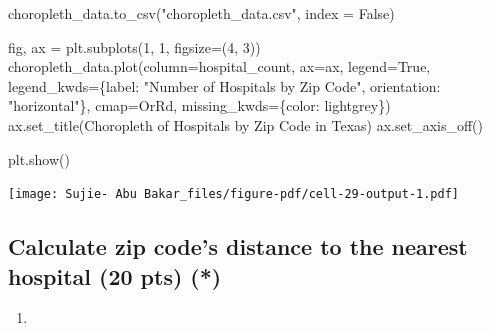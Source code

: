 \documentclass[
  letterpaper,
  DIV=11,
  numbers=noendperiod]{scrartcl}
\newenvironment{Shaded}{\begin{snugshade}}{\end{snugshade}}
\newcommand{\DecValTok}[1]{\textcolor[rgb]{0.68,0.00,0.00}{#1}}
\newcommand{\NormalTok}[1]{\textcolor[rgb]{0.00,0.23,0.31}{#1}}
\newcommand{\OperatorTok}[1]{\textcolor[rgb]{0.37,0.37,0.37}{#1}}
\newcommand{\StringTok}[1]{\textcolor[rgb]{0.13,0.47,0.30}{#1}}
\newcommand{\VariableTok}[1]{\textcolor[rgb]{0.07,0.07,0.07}{#1}}
\providecommand{\tightlist}{%
  \setlength{\itemsep}{0pt}\setlength{\parskip}{0pt}}\usepackage{longtable,booktabs,array}
\begin{document}
\begin{Shaded}
\begin{Highlighting}[]
\NormalTok{choropleth\_data.to\_csv(}\StringTok{"choropleth\_data.csv"}\NormalTok{, index }\OperatorTok{=} \VariableTok{False}\NormalTok{)}
\end{Highlighting}
\end{Shaded}

\begin{Shaded}
\begin{Highlighting}[]
\NormalTok{fig, ax }\OperatorTok{=}\NormalTok{ plt.subplots(}\DecValTok{1}\NormalTok{, }\DecValTok{1}\NormalTok{, figsize}\OperatorTok{=}\NormalTok{(}\DecValTok{4}\NormalTok{, }\DecValTok{3}\NormalTok{))}
\NormalTok{choropleth\_data.plot(column}\OperatorTok{=}\StringTok{\textquotesingle{}hospital\_count\textquotesingle{}}\NormalTok{, ax}\OperatorTok{=}\NormalTok{ax, legend}\OperatorTok{=}\VariableTok{True}\NormalTok{,}
\NormalTok{            legend\_kwds}\OperatorTok{=}\NormalTok{\{}\StringTok{\textquotesingle{}label\textquotesingle{}}\NormalTok{: }\StringTok{"Number of Hospitals by Zip Code"}\NormalTok{,}
                         \StringTok{\textquotesingle{}orientation\textquotesingle{}}\NormalTok{: }\StringTok{"horizontal"}\NormalTok{\},}
\NormalTok{            cmap}\OperatorTok{=}\StringTok{\textquotesingle{}OrRd\textquotesingle{}}\NormalTok{, missing\_kwds}\OperatorTok{=}\NormalTok{\{}\StringTok{\textquotesingle{}color\textquotesingle{}}\NormalTok{: }\StringTok{\textquotesingle{}lightgrey\textquotesingle{}}\NormalTok{\})}
\NormalTok{ax.set\_title(}\StringTok{\textquotesingle{}Choropleth of Hospitals by Zip Code in Texas\textquotesingle{}}\NormalTok{)}
\NormalTok{ax.set\_axis\_off()}

\NormalTok{plt.show()}
\end{Highlighting}
\end{Shaded}

\texttt{[image: Sujie- Abu Bakar\_files/figure-pdf/cell-29-output-1.pdf]}

\subsection{Calculate zip code's distance to the nearest hospital (20
pts)
(*)}\label{calculate-zip-codes-distance-to-the-nearest-hospital-20-pts}

\begin{enumerate}
\def\labelenumi{\arabic{enumi}.}
\tightlist
\item
\end{enumerate}
\end{document}
